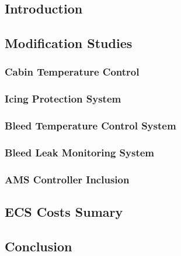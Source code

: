 \subsection{Introduction}
    

\subsection{Modification Studies}
    \subsubsection{Cabin Temperature Control}
        
    \subsubsection{Icing Protection System}
        
    \subsubsection{Bleed Temperature Control System}
        
    \subsubsection{Bleed Leak Monitoring System}
        
    \subsubsection{AMS Controller Inclusion}
        
        
\subsection{ECS Costs Sumary}
    
    
\subsection{Conclusion}
    

